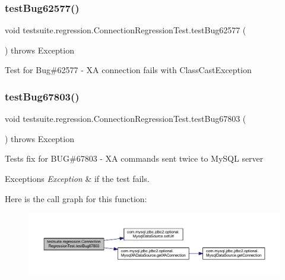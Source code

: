 \subsubsection{\texorpdfstring{test\+Bug62577()}{testBug62577()}}
{\footnotesize\ttfamily void testsuite.\+regression.\+Connection\+Regression\+Test.\+test\+Bug62577 (\begin{DoxyParamCaption}{ }\end{DoxyParamCaption}) throws Exception}

Test for Bug\#62577 -\/ XA connection fails with Class\+Cast\+Exception \mbox{\label{classtestsuite_1_1regression_1_1_connection_regression_test_a4ac113ac44c3a4432d84e3a3c062da8f}} 
\subsubsection{\texorpdfstring{test\+Bug67803()}{testBug67803()}}
{\footnotesize\ttfamily void testsuite.\+regression.\+Connection\+Regression\+Test.\+test\+Bug67803 (\begin{DoxyParamCaption}{ }\end{DoxyParamCaption}) throws Exception}

Tests fix for B\+UG\#67803 -\/ XA commands sent twice to My\+S\+QL server


\begin{DoxyExceptions}{Exceptions}
{\em Exception} & if the test fails. \\
\hline
\end{DoxyExceptions}
Here is the call graph for this function\+:
\nopagebreak
\begin{figure}[H]
\begin{center}
\leavevmode
\includegraphics[width=350pt]{classtestsuite_1_1regression_1_1_connection_regression_test_a4ac113ac44c3a4432d84e3a3c062da8f_cgraph}
\end{center}
\end{figure}
\mbox{\label{classtestsuite_1_1regression_1_1_connection_regression_test_a51c24689dc4bef4ba615be9fc98cf30a}} 
